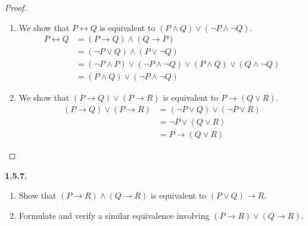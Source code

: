 \documentclass[12pt]{amsart}
\newenvironment{statement}[1]{\smallskip\noindent\color[rgb]{.6627, .3529, .6314} {\bf #1.}}{}
\theoremstyle{definition}
\theoremstyle{remark}
\begin{document}
\begin{proof}
\hfill
\begin{enumerate}
	\item We show that $P \leftrightarrow Q$ is equivalent to $(P \wedge Q) \vee (\neg P \wedge \neg Q)$.
	\begin{align*}
		P \leftrightarrow Q
		&= (P \rightarrow Q) \wedge (Q \rightarrow P) \\
		&= (\neg P \vee Q) \wedge (P \vee \neg Q) \\
		&= (\neg P \wedge P) \vee (\neg P \wedge \neg Q) \vee (P \wedge Q) \vee (Q \wedge \neg Q) \\
		&= (P \wedge Q) \vee (\neg P \wedge \neg Q)
	\end{align*}
	
	\item We show that $(P \rightarrow Q) \vee (P \rightarrow R)$ is equivalent to $P \rightarrow (Q \vee R)$.
	\begin{align*}
		(P \rightarrow Q) \vee (P \rightarrow R)
		&= (\neg P \vee Q) \vee (\neg P \vee R) \\
		&= \neg P \vee (Q \vee R) \\
		&= P \rightarrow (Q \vee R)
	\end{align*}
\end{enumerate}
\end{proof}


\begin{statement}{1.5.7}
\begin{enumerate}
	\item Show that $(P \rightarrow R) \wedge (Q \rightarrow R)$ is equivalent to $(P \vee Q) \rightarrow R$.
	
	\item Formulate and verify a similar equivalence involving $(P \rightarrow R) \vee (Q \rightarrow R)$.
\end{enumerate}
\end{statement}
\end{document}
